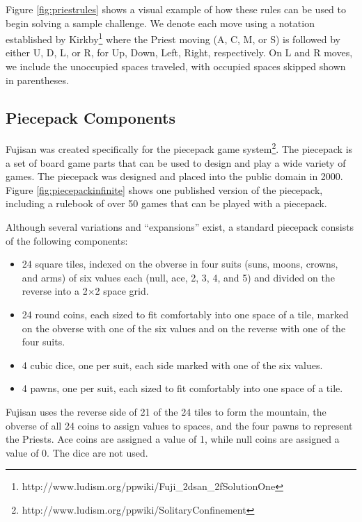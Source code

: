 \documentclass[10pt,journal,compsoc]{IEEEtran}
\begin{document}
Figure \ref{fig:priestrules} shows a visual example of how these rules can be used to begin solving a sample challenge. We denote each move using a notation established by Kirkby\footnote{http://www.ludism.org/ppwiki/Fuji\_2dsan\_2fSolutionOne} where the Priest moving (A, C, M, or S) is followed by either U, D, L, or R, for Up, Down, Left, Right, respectively. On L and R moves, we include the unoccupied spaces traveled, with occupied spaces skipped shown in parentheses.


\subsection{Piecepack Components}

Fujisan was created specifically for the piecepack game system\footnote{http://www.ludism.org/ppwiki/SolitaryConfinement}. The piecepack is a set of board game parts that can be used to design and play a wide variety of games. The piecepack was designed and placed into the public domain in 2000. Figure \ref{fig:piecepackinfinite} shows one published version of the piecepack, including a rulebook of over 50 games that can be played with a piecepack.

Although several variations and ``expansions'' exist, a standard piecepack consists of the following components:
\begin{itemize}
\item 24 square tiles, indexed on the obverse in four suits (suns, moons, crowns, and arms) of six values each (null, ace, 2, 3, 4, and 5) and divided on the reverse into a 2$\times$2 space grid.
\item 24 round coins, each sized to fit comfortably into one space of a tile, marked on the obverse with one of the six values and on the reverse with one of the four suits.
\item 4 cubic dice, one per suit, each side marked with one of the six values.
\item 4 pawns, one per suit, each sized to fit comfortably into one space of a tile.
\end{itemize}

Fujisan uses the reverse side of 21 of the 24 tiles to form the mountain, the obverse of all 24 coins to assign values to spaces, and the four pawns to represent the Priests. Ace coins are assigned a value of 1, while null coins are assigned a value of 0. The dice are not used.
\end{document}
